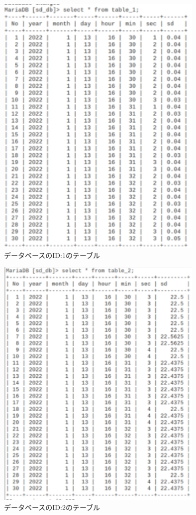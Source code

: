 \begin{figure}[H]
\begin{center}
	\includegraphics[width=10cm]{db_uv.png}
	\caption{データベースのID:1のテーブル}
	\label{fig:db_uv}
\end{center}
\end{figure}
\begin{figure}[H]
\begin{center}
	\includegraphics[width=10cm]{db_hih.png}
	\caption{データベースのID:2のテーブル}
	\label{fig:db_hih}
\end{center}
\end{figure}
